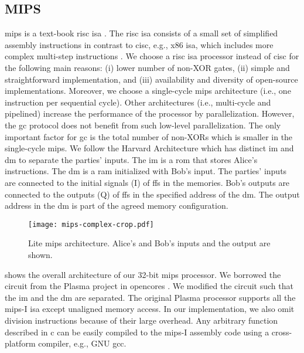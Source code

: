 \subsection{MIPS}\label{ssec:processor-mips}
\gls{mips} is a text-book \acrfull{risc} \acrshort{isa} \cite{kane1992mips}.
The \acrshort{risc} \acrshort{isa} consists of a small set of simplified assembly instructions in contrast to \acrfull{cisc}, e.g., x86 \acrshort{isa}, which includes more complex multi-step instructions \cite{hennessy2012computer}.
We choose a \acrshort{risc} \acrshort{isa} processor instead of \acrshort{cisc} for the following main reasons: (i) lower number of non-XOR gates, (ii) simple and straightforward implementation, and (iii) availability and diversity of open-source implementations.
Moreover, we choose a single-cycle \gls{mips} architecture (i.e., one instruction per sequential cycle).
Other architectures (i.e., multi-cycle and pipelined) increase the performance of the processor by parallelization.
However, the \acrshort{gc} protocol does not benefit from such low-level parallelization.
The only important factor for \acrshort{gc} is the total number of non-XORs which is smaller in the single-cycle \gls{mips}.
We follow the Harvard Architecture which has distinct \acrfull{im} and \acrfull{dm} to separate the parties' inputs.
The \acrshort{im} is a \acrfull{rom} that stores Alice's instructions.
The \acrshort{dm} is a \acrfull{ram} initialized with Bob's input.
The parties' inputs are connected to the initial signals (I) of \acrshort{ff}s in the memories.
Bob's outputs are connected to the outputs (Q) of \acrshort{ff}s in the specified address of the \acrshort{dm}.
The output address in the \acrshort{dm} is part of the agreed memory configuration.

\begin{figure}
\centering
\texttt{[image: mips-complex-crop.pdf]}
\caption{Lite \gls{mips} architecture.
  Alice's and Bob's inputs and the output are shown.}\label{figure:mips}
\end{figure}

 shows the overall architecture of our 32-bit \gls{mips} processor.
We borrowed the circuit from the Plasma project in opencores \cite{rhoads2006plasma}.
We modified the circuit such that the \acrshort{im} and the \acrshort{dm} are separated.
The original Plasma processor supports all the \gls{mips}-I \acrshort{isa} except unaligned memory access.
In our implementation, we also omit division instructions because of their large overhead.
Any arbitrary function described in \gls{c} can be easily compiled to the \gls{mips}-I assembly code using a cross-platform compiler, e.g., GNU gcc.


